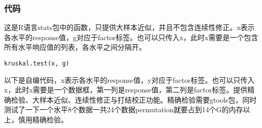\subsubsection{代码}
这是R语言stats包中的函数，只提供大样本近似，并且不包含连续性修正。x表示各水平的response值，g对应于factor标签。也可以只传入x，此时x需要是一个包含所有水平响应值的列表，各水平之间分隔开。
\begin{verbatim}
kruskal.test(x, g)
\end{verbatim}
\hspace{2em}以下是自编代码，x表示各水平的response值，y对应于factor标签。也可以只传入x，此时x需要是一个数据框，第一列是response值，第二列是factor标签。提供精确检验、大样本近似、连续性修正与打结校正功能。精确检验需要gtools包，同时测试了一下一个水平8个数据一共24个数据permutation就要占到14个G的内存以上，慎用精确检验。
\inputminted[bgcolor=white, linenos, frame=single, numbersep=5pt, breaklines]{r}{nonparametric-statistics/chapter3/kruskal-wallis.R}

